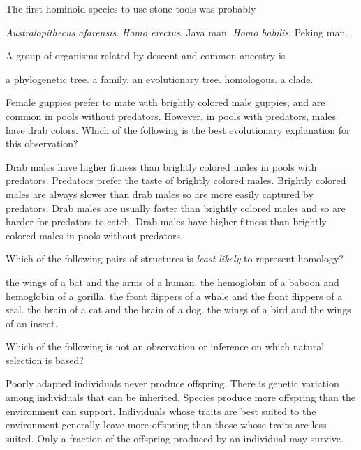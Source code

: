 \question
The first hominoid species to use stone tools was probably

\begin{choices}
\choice \textit{Australopithecus afarensis}.%
\choice \textit{Homo erectus}.%
\choice Java man.%
\correctchoice \textit{Homo habilis}.%
\choice Peking man.%
\end{choices}

\question
A group of organisms related by descent and common ancestry is

\begin{choices}
\choice a phylogenetic tree.%
\choice a family.%
\choice an evolutionary tree.%
\choice homologous.%
\correctchoice a clade.%
\end{choices}

\question
Female guppies prefer to mate with brightly colored male guppies, and are common in pools without predators. However, in pools with predators, males have drab colors. Which of the following is the best evolutionary explanation for this observation?

\begin{choices}
\correctchoice Drab males have higher fitness than brightly colored males in pools with predators.%
\choice Predators prefer the taste of brightly colored males.%
\choice Brightly colored males are always slower than drab males so are more easily captured by predators.%
\choice Drab males are usually faster than brightly colored males and so are harder for predators to catch.%
\choice Drab males have higher fitness than brightly colored males in pools without predators.%
\end{choices}

\question
Which of the following pairs of structures is \textit{least likely} to represent homology?

\begin{choices}
\choice the wings of a bat and the arms of a human.%
\choice the hemoglobin of a baboon and hemoglobin of a gorilla.%
\choice the front flippers of a whale and the front flippers of a seal.%
\choice the brain of a cat and the brain of a dog.%
\correctchoice the wings of a bird and the wings of an insect.%
\end{choices}

\question
Which of the following is not an observation or inference on which natural selection is based?

\begin{choices}
\correctchoice Poorly adapted individuals never produce offspring.%
\choice There is genetic variation among individuals that can be inherited.%
\choice Species produce more offspring than the environment can support.%
\choice Individuals whose traits are best suited to the environment generally leave more offspring than those whose traits are less suited.%
\choice Only a fraction of the offspring produced by an individual may survive.%
\end{choices}


